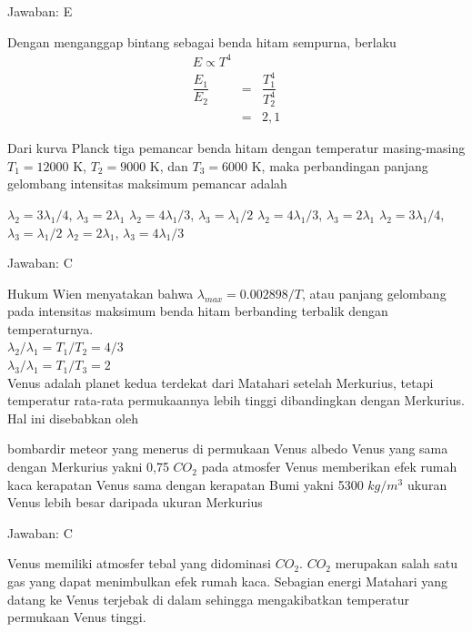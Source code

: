 \documentclass[11pt,fleqn]{exam}
\begin{document}
\begin{questions}
Jawaban: E

Dengan menganggap bintang sebagai benda hitam sempurna, berlaku
\begin{eqnarray*}
E \propto T^{4}\\
\dfrac{E_{1}}{E_{2}}&=&\dfrac{T_{1}^{4}}{T_{2}^{4}}\\
&=&2,1
\end{eqnarray*}


\question Dari kurva Planck tiga pemancar benda hitam dengan temperatur masing-masing $T_1 = 12000$ K, $T_2 = 9000$ K, dan $T_3 = 6000$ K, maka perbandingan panjang gelombang intensitas maksimum pemancar adalah
\begin{choices}
\choice $\lambda_2 = 3 \lambda_1/4$, $\lambda_3 = 2\lambda_1$
\choice $\lambda_2 = 4 \lambda_1/3$, $\lambda_3 = \lambda_1/2$
\choice $\lambda_2 = 4 \lambda_1/3$, $\lambda_3 = 2\lambda_1$
\choice $\lambda_2 = 3 \lambda_1/4$, $\lambda_3 = \lambda_1/2$
\choice $\lambda_2 = 2 \lambda_1$, $\lambda_3 = 4\lambda_1/3$
\end{choices}

Jawaban: C

Hukum Wien menyatakan bahwa $\lambda_{max} = 0.002898/T$, atau panjang gelombang pada intensitas maksimum benda hitam berbanding terbalik dengan temperaturnya.\\
$\lambda_2 / \lambda_1 = T_1 / T_2 = 4/3$ \\
$\lambda_3 / \lambda_1 = T_1 / T_3 = 2$\\


\question Venus adalah planet kedua terdekat dari Matahari setelah Merkurius, tetapi temperatur rata-rata permukaannya lebih tinggi dibandingkan dengan Merkurius. Hal ini disebabkan oleh
\begin{choices}
\choice bombardir meteor yang menerus di permukaan Venus
\choice albedo Venus yang sama dengan Merkurius yakni 0,75
\choice $CO_{2}$ pada atmosfer Venus memberikan efek rumah kaca
\choice kerapatan Venus sama dengan kerapatan Bumi yakni 5300 $kg/m^3$
\choice ukuran Venus lebih besar daripada ukuran Merkurius
\end{choices}

Jawaban: C

Venus memiliki atmosfer tebal yang didominasi $CO_2$. $CO_2$ merupakan salah satu gas yang dapat menimbulkan efek rumah kaca. Sebagian energi Matahari yang datang ke Venus terjebak di dalam sehingga mengakibatkan temperatur permukaan Venus tinggi.\\



\end{questions}
\end{document}
